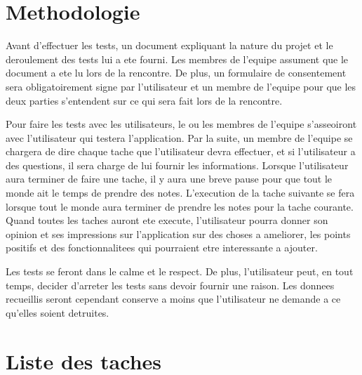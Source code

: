 \documentclass[letterpaper, oneside, 12pt, these, creativecommons]{thETS}
\begin{document}
\section{Methodologie}

Avant d'effectuer les tests, un document expliquant la nature du projet et le deroulement des tests lui a ete fourni. Les membres de l'equipe assument que le document a ete lu lors de la rencontre. De plus, un formulaire de consentement sera obligatoirement signe par l'utilisateur et un membre de l'equipe pour que les deux parties s'entendent sur ce qui sera fait lors de la rencontre.

Pour faire les tests avec les utilisateurs, le ou les membres de l'equipe s'asseoiront avec l'utilisateur qui testera l'application. Par la suite, un membre de l'equipe se chargera de dire chaque tache que l'utilisateur devra effectuer, et si l'utilisateur a des questions, il sera charge de lui fournir les informations. Lorsque l'utilisateur aura terminer de faire une tache, il y aura une breve pause pour que tout le monde ait le temps de prendre des notes. L'execution de la tache suivante se fera lorsque tout le monde aura terminer de prendre les notes pour la tache courante. Quand toutes les taches auront ete execute, l'utilisateur pourra donner son opinion et ses impressions sur l'application sur des choses a ameliorer, les points positifs et des fonctionnalitees qui pourraient etre interessante a ajouter.

Les tests se feront dans le calme et le respect. De plus, l'utilisateur peut, en tout temps, decider d'arreter les tests sans devoir fournir une raison. Les donnees recueillis seront cependant conserve a moins que l'utilisateur ne demande a ce qu'elles soient detruites.

\newpage

\section{Liste des taches}
\end{document}
